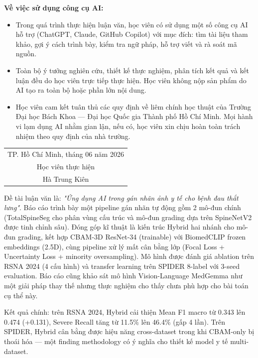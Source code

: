 \documentclass[12pt]{report}
\begin{document}
\textbf{Về việc sử dụng công cụ AI:}
\begin{itemize}
    \item[$\circ$] Trong quá trình thực hiện luận văn, học viên có sử dụng một số công cụ AI hỗ trợ (ChatGPT, Claude, GitHub Copilot) với mục đích: tìm tài liệu tham khảo, gợi ý cách trình bày, kiểm tra ngữ pháp, hỗ trợ viết và rà soát mã nguồn.
    \item[$\circ$] Toàn bộ ý tưởng nghiên cứu, thiết kế thực nghiệm, phân tích kết quả và kết luận đều do học viên trực tiếp thực hiện. Học viên không nộp sản phẩm do AI tạo ra toàn bộ hoặc phần lớn nội dung.
    \item[$\circ$] Học viên cam kết tuân thủ các quy định về liêm chính học thuật của Trường Đại học Bách Khoa --- Đại học Quốc gia Thành phố Hồ Chí Minh. Mọi hành vi lạm dụng AI nhằm gian lận, nếu có, học viên xin chịu hoàn toàn trách nhiệm theo quy định của nhà trường.
\end{itemize}

\begin{flushright}
\begin{tabular}{c}
    TP. Hồ Chí Minh, tháng 06 năm 2026 \\
    Học viên thực hiện \\[1.5em]
    Hà Trung Kiên
\end{tabular}
\end{flushright}

\newpage

Đề tài luận văn là: \textit{"Ứng dụng AI trong gán nhãn ảnh y tế cho bệnh đau thắt lưng"}. Báo cáo trình bày một pipeline gán nhãn tự động gồm 2 mô-đun chính (TotalSpineSeg cho phân vùng cấu trúc và mô-đun grading dựa trên SpineNetV2 được tinh chỉnh sâu). Đóng góp kĩ thuật là kiến trúc Hybrid hai nhánh cho mô-đun grading, kết hợp CBAM-3D ResNet-34 (trainable) với BiomedCLIP frozen embeddings (2.5D), cùng pipeline xử lý mất cân bằng lớp (Focal Loss + Uncertainty Loss + minority oversampling). Mô hình được đánh giá ablation trên RSNA 2024 (4 cấu hình) và transfer learning trên SPIDER 8-label với 3-seed evaluation. Báo cáo cũng khảo sát mô hình Vision-Language MedGemma như một giải pháp thay thế nhưng thực nghiệm cho thấy chưa phù hợp cho bài toán cụ thể này.

Kết quả chính: trên RSNA 2024, Hybrid cải thiện Mean F1 macro từ 0.343 lên 0.474 (+0.131), Severe Recall tăng từ 11.5\% lên 46.4\% (gấp 4 lần). Trên SPIDER, Hybrid cân bằng được hiệu năng cross-dataset trong khi CBAM-only bị thoái hóa --- một finding methodology có ý nghĩa cho thiết kế model y tế multi-dataset.
\end{document}
